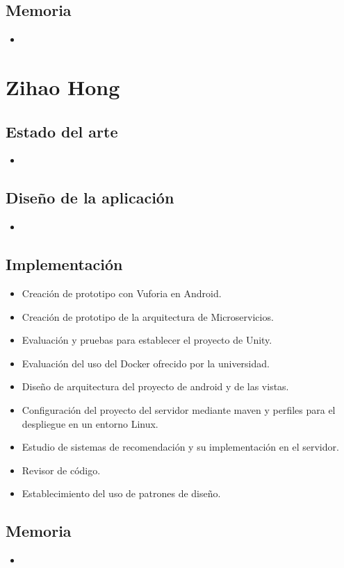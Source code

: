     \subsection{Memoria}
    \label{makereference7.3.3}
        \begin{itemize}
            \item
        \end{itemize}

\section{Zihao Hong}
\label{makereference7.4}
    \subsection{Estado del arte}
    \label{makereference7.4.1}
        \begin{itemize}
            \item
        \end{itemize}
    \subsection{Diseño de la aplicación}
    \label{makereference7.4.2}
        \begin{itemize}
            \item
        \end{itemize}
    \subsection{Implementación}
    \label{makereference7.4.3}
        \begin{itemize}  
            \item Creación de prototipo con Vuforia en Android.
            \item Creación de prototipo de la arquitectura de Microservicios.
            \item Evaluación y pruebas para establecer el proyecto de Unity.
            \item Evaluación del uso del Docker ofrecido por la universidad.
            \item Diseño de arquitectura del proyecto de android y de las
             vistas.
            \item Configuración del proyecto del servidor mediante maven y
             perfiles para el despliegue en un entorno Linux.
            \item Estudio de sistemas de recomendación y su implementación en el
            servidor.
            \item Revisor de código.
            \item Establecimiento del uso de patrones de diseño. 
        \end{itemize}
    \subsection{Memoria}
    \label{makereference7.4.3}
        \begin{itemize}
            \item
        \end{itemize}
